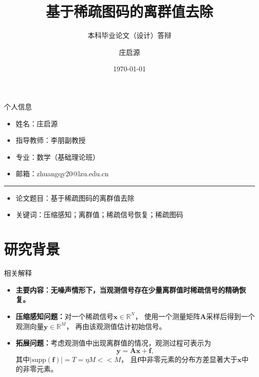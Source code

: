\documentclass{ldr-simple-gray}
\title{基于稀疏图码的离群值去除}
\subtitle{本科毕业论文（设计）答辩}
\author{庄启源}
\institute[]
{
指导教师：李朋\quad 副教授\\
兰州大学\quad 数学与统计学院
}
\date{\today}
\begin{document}
\frame{\titlepage}


\begin{frame}{个人信息}

    \begin{itemize}
        \item 姓名：庄启源
        \item 指导教师：李朋\quad 副教授
        \item 专业：数学（基础理论班）
        \item 邮箱：zhuangqy20@lzu.edu.cn
    \end{itemize}

    \qquad \noindent\rule[0.25\baselineskip]{0.9\textwidth}{1pt}




    \begin{itemize}
        \item 论文题目：基于稀疏图码的离群值去除
        \item 关键词：压缩感知；离群值；稀疏信号恢复；稀疏图码
    \end{itemize}
\end{frame}


\section{研究背景}

\begin{frame}{相关解释}
    \begin{itemize}
        \item \textbf{主要内容：无噪声情形下，当观测信号存在少量离群值时稀疏信号的精确恢复。}
        \item \textbf{压缩感知问题：}对一个稀疏信号$\mathbf{x} \in \mathbb{R}^N$，
        使用一个测量矩阵$\mathbf{A}$采样后得到一个观测向量$\mathbf{y} \in \mathbb{R}^M$，
        再由该观测值估计初始信号。
        \item \textbf{拓展问题：}考虑观测值中出现离群值的情况，观测过程可表示为
        \begin{equation*}
            \mathbf{y} = \mathbf{Ax} + \mathbf{f}, 
        \end{equation*}
        其中$\left | \mathrm{supp} (\mathbf{f}) \right | = T = \eta M << M$，
        且$\mathbf{f}$中非零元素的分布方差显著大于$\mathbf{x}$中的非零元素。
    \end{itemize}
\end{frame}
\end{document}
